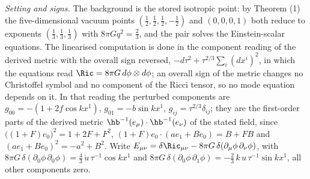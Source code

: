 \emph{Setting and signs.} The background is the stored isotropic point: by Theorem (1) the five-dimensional vacuum points $(\tfrac12, \tfrac12, \tfrac12, -\tfrac12)$ and $(0, 0, 0, 1)$ both reduce to exponents $(\tfrac13, \tfrac13, \tfrac13)$ with $8\pi G q^{2} = \tfrac23$, and the pair solves the Einstein-scalar equations. The linearised computation is done in the component reading of the derived metric with the overall sign reversed, $-d\tau^{2} + \tau^{2/3}\sum_{i}(dx^{i})^{2}$, in which the equations read $\Ric = 8\pi G\,d\phi\otimes d\phi$; an overall sign of the metric changes no Christoffel symbol and no component of the Ricci tensor, so no mode equation depends on it. In that reading the perturbed components are $g_{00} = -(1 + 2f\cos kx^{1})$, $g_{01} = -b\sin kx^{1}$, $g_{ij} = \tau^{2/3}\delta_{ij}$; they are the first-order parts of the derived metric $\hb^{-1}(e_{\mu})\cdot\hb^{-1}(e_{\nu})$ of the stated field, since $\bigl((1 + F)e_{0}\bigr)^{2} = 1 + 2F + F^{2}$, $(1 + F)e_{0}\cdot(ae_{1} + Be_{0}) = B + FB$ and $(ae_{1} + Be_{0})^{2} = -a^{2} + B^{2}$. Write $E_{\mu\nu} = \delta\Ric_{\mu\nu} - 8\pi G\,\delta(\partial_{\mu}\phi\,\partial_{\nu}\phi)$, with $8\pi G\,\delta(\partial_{0}\phi\,\partial_{0}\phi) = \tfrac43\,\dot u\,\tau^{-1}\cos kx^{1}$ and $8\pi G\,\delta(\partial_{0}\phi\,\partial_{1}\phi) = -\tfrac23\,k\,u\,\tau^{-1}\sin kx^{1}$, all other components zero.


